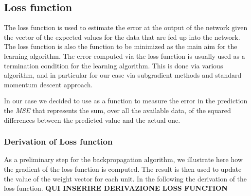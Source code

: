 \subsection{Loss function}
The loss function is used to estimate the error at the output of the network given the vector of the expected values for the data that are fed up into the network. The loss function is also the function to be minimized as the main aim for the learning algorithm. The error computed via the loss function is usually used as a termination condition for the learning algorithm. This is done via various algorithm, and in particular for our case via subgradient methods and standard momentum descent approach.\newline

In our case we decided to use as a function to measure the error in the prediction the \textit{MSE} that represents the sum, over all the available data, of the squared differences between the predicted value and the actual one.\newline

\subsubsection{Derivation of Loss function}
As a preliminary step for the backpropagation algorithm, we illustrate here how the gradient of the loss function is computed. The result is then used to update the value of the weight vector for each unit. In the following the derivation of the loss function.\newline\newline
\textbf{QUI INSERIRE DERIVAZIONE LOSS FUNCTION}


